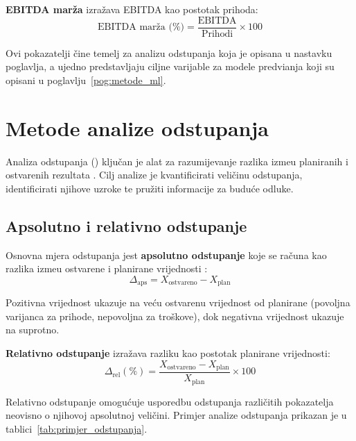 \documentclass[zavrsnirad]{fer}
\begin{document}
\textbf{EBITDA mar\v{z}a} izra\v{z}ava EBITDA kao postotak prihoda:
\begin{equation}
    \text{EBITDA mar\v{z}a (\%)} = \frac{\text{EBITDA}}{\text{Prihodi}} \times 100
    \label{eq:ebitda_marza}
\end{equation}

Ovi pokazatelji \v{c}ine temelj za analizu odstupanja koja je opisana u nastavku poglavlja, a ujedno predstavljaju ciljne varijable za modele predvi\dj anja koji su opisani u poglavlju~\ref{pog:metode_ml}.

\section{Metode analize odstupanja}
\label{sec:analiza_odstupanja}

Analiza odstupanja () klju\v{c}an je alat za razumijevanje razlika izme\dj u planiranih i ostvarenih rezultata \citep{horngren2015cost}. Cilj analize je kvantificirati veli\v{c}inu odstupanja, identificirati njihove uzroke te pru\v{z}iti informacije za budu\'{c}e odluke.

\subsection{Apsolutno i relativno odstupanje}
\label{subsec:apsolutno_relativno}

Osnovna mjera odstupanja jest \textbf{apsolutno odstupanje} koje se ra\v{c}una kao razlika izme\dj u ostvarene i planirane vrijednosti \citep{horngren2015cost}:
\begin{equation}
    \Delta_{\text{aps}} = X_{\text{ostvareno}} - X_{\text{plan}}
    \label{eq:apsolutno_odstupanje}
\end{equation}

Pozitivna vrijednost ukazuje na ve\'{c}u ostvarenu vrijednost od planirane (povoljna varijanca za prihode, nepovoljna za tro\v{s}kove), dok negativna vrijednost ukazuje na suprotno.

\textbf{Relativno odstupanje} izra\v{z}ava razliku kao postotak planirane vrijednosti:
\begin{equation}
    \Delta_{\text{rel}} (\%) = \frac{X_{\text{ostvareno}} - X_{\text{plan}}}{X_{\text{plan}}} \times 100
    \label{eq:relativno_odstupanje}
\end{equation}

Relativno odstupanje omogu\'{c}uje usporedbu odstupanja razli\v{c}itih pokazatelja neovisno o njihovoj apsolutnoj veli\v{c}ini. Primjer analize odstupanja prikazan je u tablici~\ref{tab:primjer_odstupanja}.
\end{document}
